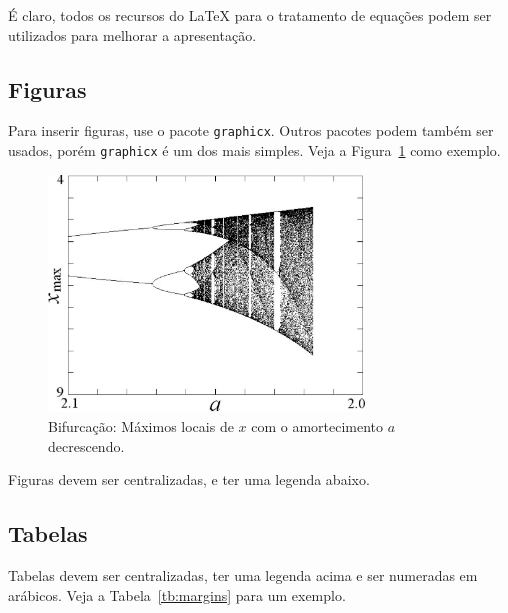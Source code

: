 \documentclass[a4paper]{ifacconf}
\begin{document}
É claro, todos os recursos do {\LaTeX} para o tratamento de equações podem
ser utilizados para melhorar a apresentação. 

\subsection{Figuras}

Para inserir figuras, use o pacote \texttt{graphicx}. Outros pacotes podem
também ser usados, porém  \texttt{graphicx} é um dos mais simples. Veja
a Figura~\ref{fig:bifurcation} como exemplo. 


\begin{figure}
\begin{center}
\includegraphics[width=8.4cm]{bifurcation.eps}    %
\caption{Bifurcação: Máximos locais de $x$ com o amortecimento $a$ decrescendo.} 
\label{fig:bifurcation}
\end{center}
\end{figure}

Figuras devem ser centralizadas, e ter uma legenda abaixo. 

\subsection{Tabelas}

Tabelas devem ser centralizadas, ter uma legenda acima e ser numeradas em arábicos.
Veja a Tabela~\ref{tb:margins} para um exemplo. 

\end{document}

